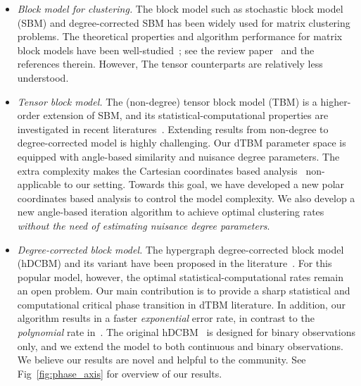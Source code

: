 \documentclass[lettersize,onecolumn,journal]{IEEEtran}
\theoremstyle{definition}
\theoremstyle{definition}
\begin{document}
\begin{itemize}[wide]
    \item \textit{Block model for clustering.} The block model such as stochastic block model (SBM) and degree-corrected SBM has been widely used for matrix clustering problems. The theoretical properties and algorithm performance for matrix block models have been well-studied~\citep{gao2018community}; see the review paper~\citep{abbe2017community} and the references therein. However, The tensor counterparts are relatively less understood. 
    
    \item  \textit{Tensor block model.} The (non-degree) tensor block model (TBM) is a higher-order extension of SBM, and its statistical-computational properties are investigated in recent literatures~\citep{wang2019multiway, han2020exact, ghoshdastidar2017consistency}. Extending results from non-degree to degree-corrected model is highly challenging. Our dTBM parameter space is equipped with angle-based similarity and nuisance degree parameters. The extra complexity makes the Cartesian coordinates based analysis~\citep{han2020exact} non-applicable to our setting. Towards this goal, we have developed a new polar coordinates based analysis to control the model complexity. We also develop a new angle-based iteration algorithm to achieve optimal clustering rates \emph{without the need of estimating nuisance degree parameters}.
    
    
    \item \textit{Degree-corrected block model.} The hypergraph degree-corrected block model (hDCBM) and its variant have been proposed in the literature~\citep{ke2019community, yuan2018testing}. For this popular model, however, the optimal statistical-computational rates remain an open problem. Our main contribution is to provide a sharp statistical and computational critical phase transition in dTBM literature. In addition, our algorithm results in a faster \emph{exponential} error rate, in contrast to the \emph{polynomial} rate in~\cite{ke2019community}. The original hDCBM~\citep{ke2019community} is designed for binary observations only, and we extend the model to both continuous and binary observations. We believe our results are novel and helpful to the community. See Fig~\ref{fig:phase_axis} for overview of our results. 
    

\end{itemize}
\end{document}
